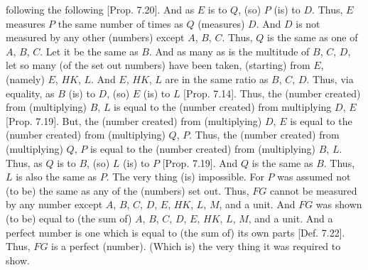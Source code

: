 \begin{Parallel}{}{}
{following the following [Prop. 7.20].
And as $E$ is to $Q$, (so) $P$ (is) to $D$. Thus, $E$ measures $P$ the same number of times as $Q$ (measures) $D$. And $D$ is not measured by any
other (numbers) except $A$, $B$, $C$.  Thus, $Q$ is the same as one
of $A$, $B$, $C$. Let it be the same as $B$. And as many as is the
multitude of $B$, $C$, $D$, let so many (of the set out numbers) have been taken, (starting) from $E$, 
(namely) $E$, $HK$, $L$. And $E$, $HK$, $L$ are in the same ratio as
$B$, $C$, $D$. Thus, via equality, as $B$ (is) to $D$, (so) $E$ (is) to $L$
[Prop. 7.14]. Thus, the (number created) from
(multiplying) $B$, $L$ is equal to the (number created) from multiplying
$D$, $E$ [Prop. 7.19]. But, the (number created)
from (multiplying) $D$, $E$ is equal to the (number created) from (multiplying)
$Q$, $P$. Thus, the (number created) from (multiplying) $Q$, $P$
is equal to the (number created) from (multiplying) $B$, $L$. Thus, as
$Q$ is to $B$, (so) $L$ (is) to $P$ [Prop. 7.19]. 
And $Q$ is the same as $B$. Thus, $L$ is also the same as $P$. The
very thing (is) impossible. For $P$ was assumed not (to be) the same
as any of the (numbers) set out. Thus, $FG$ cannot be measured by any number except $A$, $B$, $C$, $D$, $E$, $HK$, $L$, $M$, and a unit.
And $FG$ was shown (to be) equal to (the sum of) $A$, $B$, $C$, $D$, $E$, $HK$,
$L$, $M$, and a unit. And a perfect number is one which is equal to (the sum of) its own
parts [Def. 7.22]. Thus, $FG$ is a perfect (number).
(Which is) the very thing it was required to show.}
\end{Parallel}



\newpage
\thispagestyle{plain}
~\\